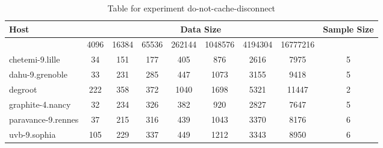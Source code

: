 \begin{table}
\caption{Table for experiment do-not-cache-disconnect}
\begin{tabular}{@{}lcccccccc@{}}
\toprule
Host    & \multicolumn{7}{c}{Data Size}          & Sample Size \\ \midrule
& 4096  & 16384  & 65536  & 262144  & 1048576  & 4194304  & 16777216              \\ \midrule
chetemi-9.lille  & 34  & 151  & 177  & 405  & 876  & 2616  & 7975  & 5 \\
dahu-9.grenoble  & 33  & 231  & 285  & 447  & 1073  & 3155  & 9418  & 5 \\
degroot  & 222  & 358  & 372  & 1040  & 1698  & 5321  & 11447  & 2 \\
graphite-4.nancy  & 32  & 234  & 326  & 382  & 920  & 2827  & 7647  & 5 \\
paravance-9.rennes  & 37  & 215  & 316  & 439  & 1043  & 3370  & 8176  & 6 \\
uvb-9.sophia  & 105  & 229  & 337  & 449  & 1212  & 3343  & 8950  & 6 \\
\bottomrule
\end{tabular}
\end{table}